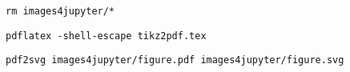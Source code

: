 \documentclass{scrartcl}
\begin{document}



\texttt{rm images4jupyter/*}

\texttt{pdflatex -shell-escape tikz2pdf.tex}

\texttt{pdf2svg images4jupyter/figure.pdf images4jupyter/figure.svg}
\end{document}
